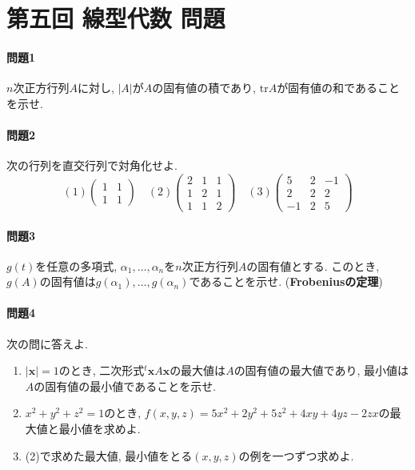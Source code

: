 \documentclass[a4j,dvipdfmx]{jsarticle}
\newcommand{\tr}{\mathrm{tr}}
\begin{document}
    \part*{第五回 線型代数 問題}
    \subsection*{問題1}
        $n$次正方行列$A$に対し, $|A|$が$A$の固有値の積であり, $\tr A$が固有値の和であることを示せ.
    \subsection*{問題2}
        次の行列を直交行列で対角化せよ.
        \begin{equation*}
            (1)\begin{pmatrix}
                1 & 1\\1 & 1
            \end{pmatrix}\quad
            (2)\begin{pmatrix}
                2 & 1 & 1\\
                1 & 2 & 1\\
                1 & 1 & 2
            \end{pmatrix}\quad
            (3)\begin{pmatrix}
                5 & 2 & -1\\
                2 & 2 & 2\\
                -1 & 2 & 5
            \end{pmatrix}
        \end{equation*}
    \subsection*{問題3}
        $g(t)$を任意の多項式, $\alpha_1,\dots,\alpha_n$を$n$次正方行列$A$の固有値とする. このとき, $g(A)$の固有値は$g(\alpha_1),\dots,g(\alpha_n)$であることを示せ. (\textbf{Frobeniusの定理})
    \subsection*{問題4}
        次の問に答えよ. 
        \begin{enumerate}
            \item $|\bm{x}|=1$のとき, 二次形式${}^t \bm{x}A\bm{x}$の最大値は$A$の固有値の最大値であり, 最小値は$A$の固有値の最小値であることを示せ.
            \item $x^2+y^2+z^2=1$のとき, $f(x,y,z)=5x^2+2y^2+5z^2+4xy+4yz-2zx$の最大値と最小値を求めよ.
            \item (2)で求めた最大値, 最小値をとる$(x,y,z)$の例を一つずつ求めよ.
        \end{enumerate}
\end{document}
